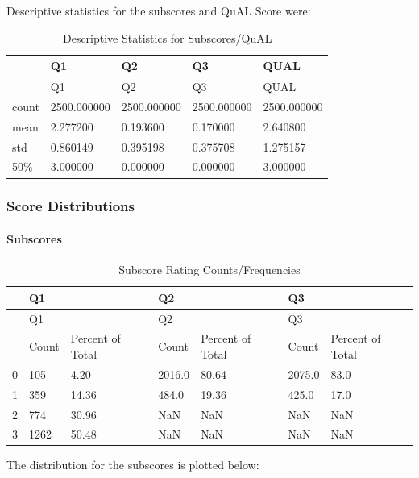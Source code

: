 \documentclass[
  letterpaper,
  DIV=11,
  numbers=noendperiod]{scrartcl}
\let\oldparagraph\paragraph
\renewcommand{\paragraph}[1]{\oldparagraph{#1}\mbox{}}
\begin{document}
Descriptive statistics for the subscores and QuAL Score were:

\hypertarget{tbl-descrips}{}
\begin{longtable}[]{@{}lllll@{}}
\caption{\label{tbl-descrips}Descriptive Statistics for
Subscores/QuAL}\tabularnewline
\toprule()
& Q1 & Q2 & Q3 & QUAL \\
\midrule()
\endfirsthead
\toprule()
& Q1 & Q2 & Q3 & QUAL \\
\midrule()
\endhead
count & 2500.000000 & 2500.000000 & 2500.000000 & 2500.000000 \\
mean & 2.277200 & 0.193600 & 0.170000 & 2.640800 \\
std & 0.860149 & 0.395198 & 0.375708 & 1.275157 \\
50\% & 3.000000 & 0.000000 & 0.000000 & 3.000000 \\
\bottomrule()
\end{longtable}

\hypertarget{score-distributions}{%
\subsubsection{Score Distributions}\label{score-distributions}}

\hypertarget{subscores}{%
\paragraph{Subscores}\label{subscores}}

\hypertarget{tbl-distsubscore}{}
\begin{longtable}[]{@{}lllllll@{}}
\caption{\label{tbl-distsubscore}Subscore Rating
Counts/Frequencies}\tabularnewline
\toprule()
& Q1 & & Q2 & & Q3 & \\
\midrule()
\endfirsthead
\toprule()
& Q1 & & Q2 & & Q3 & \\
\midrule()
\endhead
& Count & Percent of Total & Count & Percent of Total & Count & Percent
of Total \\
0 & 105 & 4.20 & 2016.0 & 80.64 & 2075.0 & 83.0 \\
1 & 359 & 14.36 & 484.0 & 19.36 & 425.0 & 17.0 \\
2 & 774 & 30.96 & NaN & NaN & NaN & NaN \\
3 & 1262 & 50.48 & NaN & NaN & NaN & NaN \\
\bottomrule()
\end{longtable}

The distribution for the subscores is plotted below:
\end{document}
